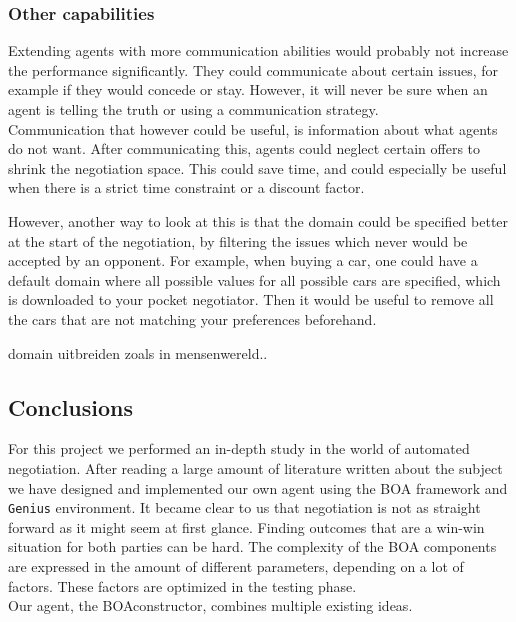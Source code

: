 \subsubsection{Other capabilities}
Extending agents with more communication abilities would probably not increase the performance significantly. They could
communicate about certain issues, for example if they would concede or stay. However, it will never be sure when an agent is telling the truth or using a communication strategy. \\

Communication that however could be useful, is information about what agents do not want. After communicating this, agents could neglect certain offers to shrink the negotiation space. This could save time, and could especially be useful when there is a strict time constraint or a discount factor. 

However, another way to look at this is that the domain could be specified better at the start of the negotiation, by filtering the issues which never would be accepted by an opponent. For example, when buying a car, one could have a default domain where all possible values for all possible cars are specified, which is 
downloaded to your pocket negotiator. Then it would be useful to remove all the cars that are not matching your preferences beforehand. 

domain uitbreiden zoals in mensenwereld..

\subsection{Conclusions}

For this project we performed an in-depth study in the world of automated negotiation. After reading a large amount of literature written about the subject we have designed and implemented our own agent using the BOA framework and \texttt{Genius} environment. It became clear to us that negotiation is not as straight forward as it might seem at first glance. Finding outcomes that are a win-win situation for both parties can be hard. The complexity of the BOA components are expressed in the amount of different parameters, depending on a lot of factors. These factors are optimized in the testing phase.  \\

Our agent, the BOAconstructor, combines multiple existing ideas.


